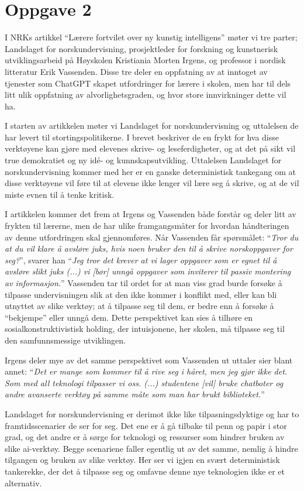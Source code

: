 \documentclass[a4paper, 12pt]{article}  %
\begin{document}
\section*{Oppgave 2}

I NRKs artikkel ``Lærere fortvilet over ny kunstig intelligens'' møter vi tre parter; Landslaget for norskundervisning, prosjektleder for forskning og kunstnerisk utviklingsarbeid på Høyskolen Kristiania Morten Irgens, og professor i nordisk litteratur Erik Vassenden. Disse tre deler en oppfatning av at inntoget av tjenester som ChatGPT skapet utfordringer for lærere i skolen, men har til dels litt ulik oppfatning av alvorlighetsgraden, og hvor store innvirkninger dette vil ha.

I starten av artikkelen møter vi Landslaget for norskundervisning og uttalelsen de har levert til stortingspolitikerne. I brevet beskriver de en frykt for hva disse verktøyene kan gjøre med elevenes skrive- og leseferdigheter, og at det på sikt vil true demokratiet og ny idé- og kunnskapsutvikling. Uttalelsen Landslaget for norskundervisning kommer med her er en ganske deterministisk tankegang om at disse verktøyene vil føre til at elevene ikke lenger vil lære seg å skrive, og at de vil miste evnen til å tenke kritisk.

I artikkelen kommer det frem at Irgens og Vassenden både forstår og deler litt av frykten til lærerne, men de har ulike framgangsmåter for hvordan håndteringen av denne utfordringen skal gjennomføres. Når Vassenden får spørsmålet: ``\textit{Tror du at du vil klare å avsløre juks, hvis noen bruker den til å skrive norskoppgaver for seg?}'', svarer han ``\textit{Jeg tror det krever at vi lager oppgaver som er egnet til å avsløre slikt juks (...) vi [bør] unngå oppgaver som inviterer til passiv montering av informasjon.}'' Vassenden tar til ordet for at man viss grad burde forsøke å tilpasse undervisningen slik at den ikke kommer i konflikt med, eller kan bli utnyttet av slike verktøy; at å tilpasse seg til dem, er bedre enn å forsøke å ``bekjempe'' eller unngå dem. Dette perspektivet kan sies å tilhøre en sosialkonstruktivistisk holding, der intuisjonene, her skolen, må tilpasse seg til den samfunnsmessige utviklingen.

Irgens deler mye av det samme perspektivet som Vassenden ut uttaler sier blant annet: ``\textit{Det er mange som kommer til å rive seg i håret, men jeg gjør ikke det. Som med all teknologi tilpasser vi oss. (...) studentene [vil] bruke chatboter og andre avanserte verktøy på samme måte som man har brukt biblioteket.}''

Landslaget for norskundervisning er derimot ikke like tilpasningsdyktige og har to framtidsscenarier de ser for seg. Det ene er å gå tilbake til penn og papir i stor grad, og det andre er å sørge for teknologi og ressurser som hindrer bruken av slike ai-verktøy. Begge scenariene faller egentlig ut av det samme, nemlig å hindre tilgangen og bruken av slike verktøy. Her ser vi igjen en svært deterministisk tankerekke, der det å tilpasse seg og omfavne denne nye teknologien ikke er et alternativ.

\printbibliography[heading=bibintoc] %
\end{document}
